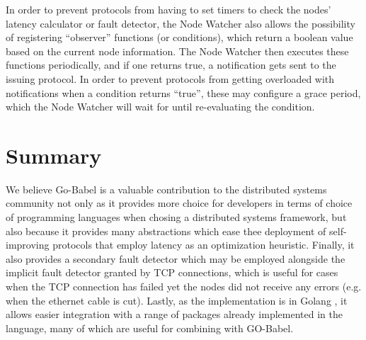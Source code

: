 In order to prevent protocols from having to set timers to check the nodes' latency calculator or fault detector, the Node Watcher also allows the possibility of registering ``observer'' functions (or conditions), which return a boolean value based on the current node information. The Node Watcher then executes these functions periodically, and if one returns true, a notification gets sent to the issuing protocol. In order to prevent protocols from getting overloaded with notifications when a condition returns ``true'', these may configure a grace period, which the Node Watcher will wait for until re-evaluating the condition.

\section{Summary}

We believe Go-Babel is a valuable contribution to the distributed systems community not only as it provides more choice for developers in terms of choice of programming languages when chosing a distributed systems framework, but also because it provides many abstractions which ease thee deployment of self-improving protocols that employ latency as an optimization heuristic. Finally, it also provides a secondary fault detector which may be employed alongside the implicit fault detector granted by TCP connections, which is useful for cases when the TCP connection has failed yet the nodes did not receive any errors (e.g. when the ethernet cable is cut). Lastly, as the implementation is in Golang \cite{golang}, it allows easier integration with a range of packages already implemented in the language, many of which are useful for combining with GO-Babel. 
